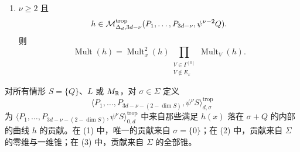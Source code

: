 \begin{definition}
\begin{enumerate}[label=(\arabic*),leftmargin=2.2em,itemsep=2pt]
\begin{enumerate}[label=(\alph*),leftmargin=2.2em,itemsep=2pt]
  \item $\nu\ge2$ 且
    \[
      h\in\mathcal{M}^{\mathrm{trop}}_{\Delta_d,3d-\nu}(P_1,\ldots,P_{3d-\nu},\psi^{\nu-2}Q).
    \]
    则
    \[
      \operatorname{Mult}(h)=\operatorname{Mult}^2_x(h)
      \prod_{\substack{V\in\Gamma^{[0]}\\ V\notin E_x}}\operatorname{Mult}_V(h).
    \]
  \end{enumerate}
\end{enumerate}
对所有情形 $S=\{Q\}$、$L$ 或 $M_{\mathbb{R}}$，对 $\sigma\in\Sigma$ 定义
\begin{equation}
  \bigl\langle P_1,\ldots,P_{3d-\nu-(2-\dim S)},\psi^\nu S\bigr\rangle^{\mathrm{trop}}_{d,\sigma} \tag{5.4}
\end{equation}
为 $\bigl\langle P_1,\ldots,P_{3d-\nu-(2-\dim S)},\psi^\nu S\bigr\rangle^{\mathrm{trop}}_{0,d}$ 中来自那些满足 $h(x)$ 落在 $\sigma+Q$ 的内部的曲线 $h$ 的贡献。在 (1) 中，唯一的贡献来自 $\sigma=\{0\}$；在 (2) 中，贡献来自 $\Sigma$ 的零维与一维锥；在 (3) 中，贡献来自 $\Sigma$ 的全部锥。
\end{definition}


